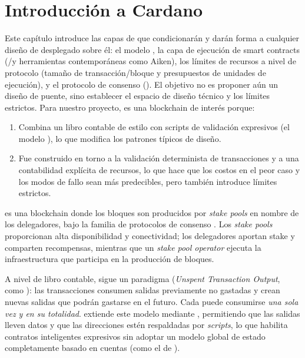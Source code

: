 
\section{Introducción a Cardano}

Este capítulo introduce las capas de \Cardano que condicionarán y darán forma a cualquier diseño de \zkBridge desplegado sobre él: el modelo \eUTxO, la capa de ejecución de smart contracts (\Plutus/\UPLC y herramientas contemporáneas como Aiken), los límites de recursos a nivel de protocolo (tamaño de transacción/bloque y presupuestos de unidades de ejecución), y el protocolo de consenso (\Praos). El objetivo no es proponer aún un diseño de puente, sino establecer el espacio de diseño técnico y los límites estrictos. Para nuestro proyecto, \Cardano es una blockchain de interés porque:

\begin{enumerate}[noitemsep]
	\item Combina un libro contable de estilo \UTxO con scripts de validación expresivos (el modelo \eUTxO), lo que modifica los patrones típicos de diseño.
	\item Fue construido en torno a la validación determinista de transacciones y a una contabilidad explícita de recursos, lo que hace que los costos en el peor caso y los modos de fallo sean más predecibles, pero también introduce límites estrictos.
\end{enumerate}

\Cardano es una blockchain donde los bloques son producidos por \emph{stake pools} en nombre de los delegadores, bajo la familia de protocolos de consenso \Ouroboros. Los \emph{stake pools} proporcionan alta disponibilidad y conectividad; los delegadores aportan stake y comparten recompensas, mientras que un \emph{stake pool operator} ejecuta la infraestructura que participa en la producción de bloques.

A nivel de libro contable, \Cardano sigue un paradigma \UTxO (\emph{Unspent Transaction Output}, como \Bitcoin): las transacciones consumen salidas previamente no gastadas y crean nuevas salidas que podrán gastarse en el futuro. Cada \UTxO puede consumirse \emph{una sola vez y en su totalidad}. \Cardano extiende este modelo mediante \eUTxO, permitiendo que las salidas lleven datos y que las direcciones estén respaldadas por \textit{scripts}, lo que habilita contratos inteligentes expresivos sin adoptar un modelo global de estado completamente basado en cuentas (como el de \Ethereum).

